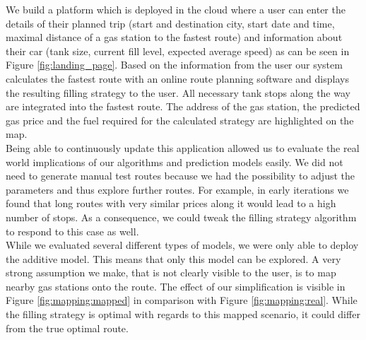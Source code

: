 \documentclass[%
a4paper,
DIV12,
2.5headlines,
bigheadings,
titlepage,
openbib,
]{scrartcl}
\begin{document}
We build a platform which is deployed in the cloud where a user can enter the details of their planned trip (start and destination city, start date and time, maximal distance of a gas station to the fastest route) and information about their car (tank size, current fill level, expected average speed) as can be seen in Figure \ref{fig:landing_page}.
Based on the information from the user our system calculates the fastest route with an online route planning software and displays the resulting filling strategy to the user.
All necessary tank stops along the way are integrated into the fastest route.
The address of the gas station, the predicted gas price and the fuel required for the calculated strategy are highlighted on the map.
\\ %
Being able to continuously update this application allowed us to evaluate the real world implications of our algorithms and prediction models easily.
We did not need to generate manual test routes because we had the possibility to adjust the parameters and thus explore further routes.
For example, in early iterations we found that long routes with very similar prices along it would lead to a high number of stops.
As a consequence, we could tweak the filling strategy algorithm to respond to this case as well.
\\ %
While we evaluated several different types of models, we were only able to deploy the additive model.
This means that only this model can be explored.
A very strong assumption we make, that is not clearly visible to the user, is to map nearby gas stations onto the route.
The effect of our simplification is visible in Figure \ref{fig:mapping:mapped} in comparison with Figure \ref{fig:mapping:real}.
While the filling strategy is optimal with regards to this mapped scenario, it could differ from the true optimal route.


\end{document}
